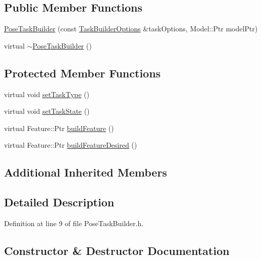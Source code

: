 \subsection*{Public Member Functions}
\begin{DoxyCompactItemize}
\item 
\hyperlink{classocra_1_1PoseTaskBuilder_aee81134b7353f3ee147a6129a0a265a9}{Pose\+Task\+Builder} (const \hyperlink{classocra_1_1TaskBuilderOptions}{Task\+Builder\+Options} \&task\+Options, Model\+::\+Ptr model\+Ptr)
\item 
virtual \hyperlink{classocra_1_1PoseTaskBuilder_ad71d138985d6a4c6145818b5ab51b72a}{$\sim$\+Pose\+Task\+Builder} ()
\end{DoxyCompactItemize}
\subsection*{Protected Member Functions}
\begin{DoxyCompactItemize}
\item 
virtual void \hyperlink{classocra_1_1PoseTaskBuilder_aafc5b611352f7cbebecaa51cf534c68c}{set\+Task\+Type} ()
\item 
virtual void \hyperlink{classocra_1_1PoseTaskBuilder_a3bc6c07a3ee7656a1f3051500baddbd8}{set\+Task\+State} ()
\item 
virtual Feature\+::\+Ptr \hyperlink{classocra_1_1PoseTaskBuilder_a9a5cd51010fb610f00eea794e1f8f701}{build\+Feature} ()
\item 
virtual Feature\+::\+Ptr \hyperlink{classocra_1_1PoseTaskBuilder_a66fa4cdba48138741e19e642684a7006}{build\+Feature\+Desired} ()
\end{DoxyCompactItemize}
\subsection*{Additional Inherited Members}


\subsection{Detailed Description}


Definition at line 9 of file Pose\+Task\+Builder.\+h.



\subsection{Constructor \& Destructor Documentation}
